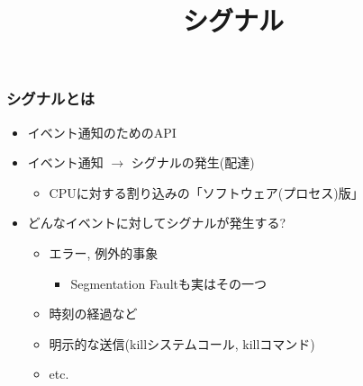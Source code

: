 \documentclass[12pt,dvipdfmx]{beamer}
\title{シグナル}
\begin{document}
\maketitle

\iffalse
\begin{frame}
\frametitle{目次}
\tableofcontents
\end{frame}
\fi


\begin{frame}
  \frametitle{シグナルとは}
  \begin{itemize}
  \item イベント通知のためのAPI
  \item イベント通知 $\rightarrow$ シグナルの発生(配達)
    \begin{itemize}
    \item CPUに対する割り込みの「ソフトウェア(プロセス)版」
    \end{itemize}
  \item どんなイベントに対してシグナルが発生する?
    \begin{itemize}
    \item エラー, 例外的事象
      \begin{itemize}
      \item Segmentation Faultも実はその一つ
      \end{itemize}
    \item 時刻の経過など
    \item 明示的な送信(killシステムコール, killコマンド)
    \item etc.
    \end{itemize}
  \end{itemize}
\end{frame}
\end{document}
